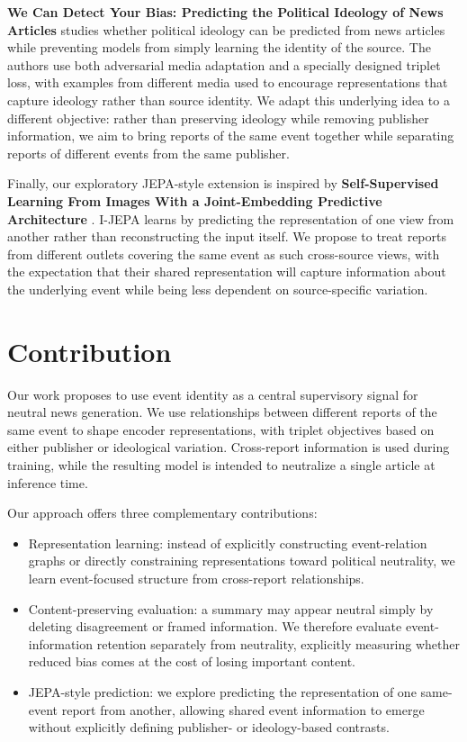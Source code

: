 \documentclass[11pt]{article}
\begin{document}
\textbf{We Can Detect Your Bias: Predicting the Political Ideology of News Articles} \citep{baly2020detect} studies whether political ideology can be predicted from news articles while preventing models from simply learning the identity of the source. The authors use both adversarial media adaptation and a specially designed triplet loss, with examples from different media used to encourage representations that capture ideology rather than source identity. We adapt this underlying idea to a different objective: rather than preserving ideology while removing publisher information, we aim to bring reports of the same event together while separating reports of different events from the same publisher.

Finally, our exploratory JEPA-style extension is inspired by \textbf{Self-Supervised Learning From Images With a Joint-Embedding Predictive Architecture} \citep{assran2023ijepa}. I-JEPA learns by predicting the representation of one view from another rather than reconstructing the input itself. We propose to treat reports from different outlets covering the same event as such cross-source views, with the expectation that their shared representation will capture information about the underlying event while being less dependent on source-specific variation.

\section{Contribution}

Our work proposes to use event identity as a central supervisory signal for neutral news generation. We use relationships between different reports of the same event to shape encoder representations, with triplet objectives based on either publisher or ideological variation. Cross-report information is used during training, while the resulting model is intended to neutralize a single article at inference time.

Our approach offers three complementary contributions:

\begin{itemize}
\item Representation learning: instead of explicitly constructing event-relation graphs or directly constraining representations toward political neutrality, we learn event-focused structure from cross-report relationships.
\item Content-preserving evaluation: a summary may appear neutral simply by deleting disagreement or framed information. We therefore evaluate event-information retention separately from neutrality, explicitly measuring whether reduced bias comes at the cost of losing important content.
\item JEPA-style prediction: we explore predicting the representation of one same-event report from another, allowing shared event information to emerge without explicitly defining publisher- or ideology-based contrasts.
\end{itemize}
\end{document}
